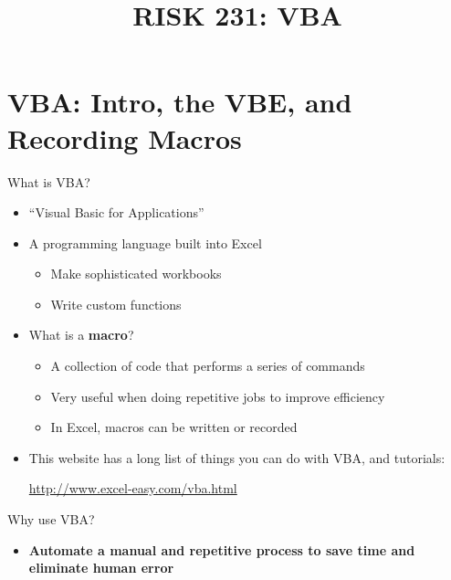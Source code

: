 \documentclass{beamer}
\title{RISK 231: VBA}
\begin{document}
\maketitle

\section{VBA: Intro, the VBE, and Recording Macros}

\sectionframe

\begin{frame}{What is VBA?}
\begin{itemize}
  \item ``Visual Basic for Applications''
  \item A programming language built into Excel
  \begin{itemize}
    \item Make sophisticated workbooks
    \item Write custom functions
  \end{itemize}
  \item What is a \textbf{macro}?
  \begin{itemize}
    \item A collection of code that performs a series of commands
    \item Very useful when doing repetitive jobs to improve efficiency
    \item In Excel, macros can be written or recorded
  \end{itemize}
  \item This website has a long list of things you can do with VBA, and tutorials:
  \begin{center}
    \url{http://www.excel-easy.com/vba.html}
  \end{center}
\end{itemize}
\end{frame}

\begin{frame}{Why use VBA?}
\begin{itemize}
  \item \textbf{Automate a manual and repetitive process to save time and
        eliminate human error}
\end{itemize}
\end{frame}
\end{document}
